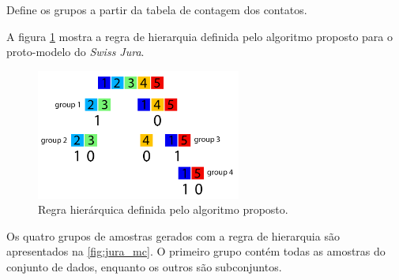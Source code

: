 \begin{algorithm}[H]
\SetAlgoLined
 \caption{Define os grupos a partir da tabela de contagem dos contatos.}\label{algo:group}
\end{algorithm}

A figura \ref{fig:groups_fig} mostra a regra de hierarquia definida pelo algoritmo proposto para o proto-modelo do \textit{Swiss Jura}.

\begin{figure}[H]
	\caption{\label{fig:groups_fig} Regra hierárquica definida pelo algoritmo proposto.}
	\centering
		\includegraphics[width=0.6\textwidth]{capitulo_3/imagens/grouping.png}
\end{figure}

Os quatro grupos de amostras gerados com a regra de hierarquia são apresentados na \autoref{fig:jura_mc}. O primeiro grupo contém todas as amostras do conjunto de dados, enquanto os outros são subconjuntos.

